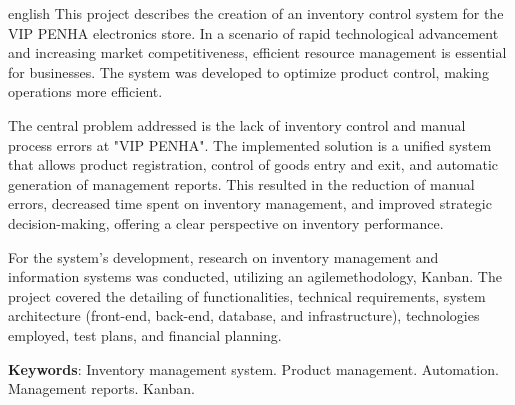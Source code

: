 \documentclass[
	12pt,				%
	openany,			%
	twoside,			%
	a4paper,			%
	english,			%
	brazil				%
	]{abntex2}
\newcommand{\listofquadrosname}{Lista de quadros}
\let\cleardoublepage\clearpage
\begin{document}
\begin{resumo}[Abstract]
 \begin{otherlanguage*}{english}
This project describes the creation of an inventory control system for the VIP PENHA electronics store. In a scenario of rapid technological advancement and increasing market competitiveness, efficient resource management is essential for businesses. The system was developed to
optimize product control, making operations more efficient. 

The central problem addressed is the lack of inventory control and manual process errors at "VIP PENHA". The implemented solution is a unified system that allows product registration, control of goods entry and exit, and automatic generation of management reports. This resulted in the reduction of manual errors, decreased time spent on inventory management, and improved strategic decision-making, offering a clear perspective on inventory performance. 

For the system's development, research on inventory management and information systems was conducted, utilizing an agilemethodology, Kanban. The project covered the detailing of functionalities, technical requirements, system architecture (front-end, back-end, database, and infrastructure), technologies employed, test plans, and financial planning.


   \vspace{\onelineskip}
 
   \noindent 
   \textbf{Keywords}: Inventory management system. Product management. Automation. Management reports. Kanban.
 \end{otherlanguage*}
\end{resumo}



\listoffigures*
\clearpage

\pdfbookmark[0]{\listofquadrosname}{loq}
\listofquadros*
\cleardoublepage

\listoftables*
\cleardoublepage



\tableofcontents*
\cleardoublepage
\end{document}
